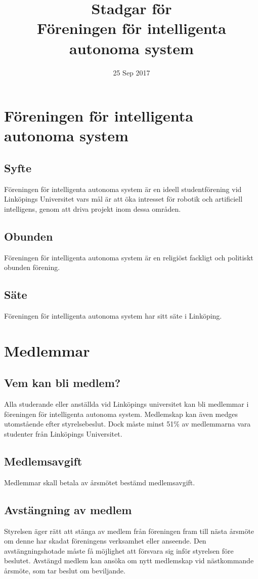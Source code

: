 \documentclass[11pt,a4paper]{article}
\title{Stadgar för\\Föreningen för intelligenta autonoma system}
\date{25 Sep 2017}
\begin{document}
\maketitle

\section{Föreningen för intelligenta autonoma system}

\subsection{Syfte}
Föreningen för intelligenta autonoma system är en ideell studentförening vid Linköpings Universitet vars mål är att öka intresset för robotik och artificiell intelligens, genom att driva projekt inom dessa områden. 
\subsection{Obunden}
Föreningen för intelligenta autonoma system är en religiöst fackligt och
politiskt obunden förening.
\subsection{Säte}
Föreningen för intelligenta autonoma system har sitt säte i Linköping.

\section{Medlemmar}

\subsection{Vem kan bli medlem?}
Alla studerande eller anställda vid Linköpings universitet kan bli medlemmar i föreningen för intelligenta autonoma system.
Medlemskap kan även medges utomstående efter styrelsebeslut. Dock måste minst 51\% av medlemmarna vara studenter från Linköpings Universitet. 
\subsection{Medlemsavgift}
Medlemmar skall betala av årsmötet bestämd medlemsavgift.
\subsection{Avstängning av medlem}
Styrelsen äger rätt att stänga av medlem från föreningen fram till nästa
årsmöte om denne har skadat föreningens verksamhet eller anseende. Den
avstängningshotade måste få möjlighet att försvara sig inför styrelsen före
beslutet. Avstängd medlem kan ansöka om nytt medlemskap vid
nästkommande årsmöte, som tar beslut om beviljande.
\end{document}
